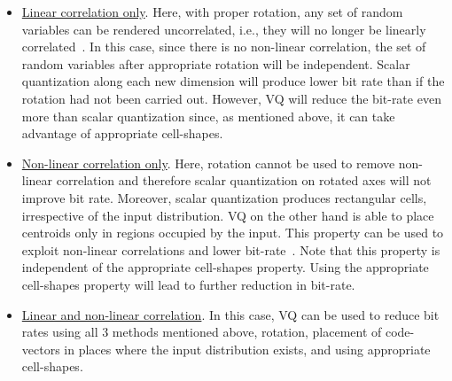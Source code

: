 \begin{enumerate}
\begin{itemize}
\item \underline{Linear correlation only}. Here, with proper rotation, any set of random variables can be rendered uncorrelated, i.e., they will no longer be linearly correlated~\cite{1985_JNL_VQ_Makhoul}.  In this case, since there is no non-linear correlation, the set of random variables after appropriate rotation will be independent.  Scalar quantization along each new dimension will produce lower bit rate than if the rotation had not been carried out.  However, VQ will reduce the bit-rate even more than scalar quantization since, as mentioned above, it can take advantage of appropriate cell-shapes.
\item \underline{Non-linear correlation only}.  Here, rotation cannot be used to remove non-linear correlation and therefore scalar quantization on rotated axes will not improve bit rate.  Moreover, scalar quantization produces rectangular cells, irrespective of the input distribution.  VQ on the other hand is able to place centroids only in regions occupied by the input.  This property can be used to exploit non-linear correlations and lower bit-rate~\cite{1985_JNL_VQ_Makhoul}.  Note that this property is independent of the appropriate cell-shapes property.  Using the appropriate cell-shapes property will lead to further reduction in bit-rate.

\item \underline{Linear and non-linear correlation}.  In this case, VQ can be used to reduce bit rates using all 3 methods mentioned above, rotation, placement of code-vectors in places where the input distribution exists, and using appropriate cell-shapes.
\end{itemize}

\end{enumerate}

